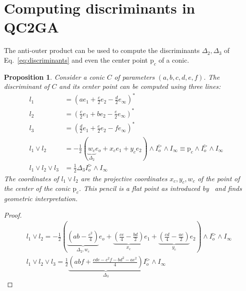 \documentclass{birkjour}
\newtheorem{proposition}{Proposition}
\begin{document}
\section{Computing discriminants in QC2GA}
\label{sec:discriminants}
The anti-outer product can be used to compute the discriminants \(\Delta_2, \Delta_3\) of Eq.~\eqref{eq:discriminants} and even the center point \(\mathrm{p}_c\) of a conic.

\begin{proposition}
    Consider a conic \(C\) of parameters \((a,b,c,d,e,f)\).
    The discriminant of \(C\) and its center point can be computed using three lines:
    \begin{align}
    l_1 &= \left(a e_1 + \frac{c}{2} e_2 - \frac{d}{2} e_\infty\right)^* \\
    l_2 &= \left(\frac{c}{2} e_1 + b e_2 - \frac{e}{2} e_\infty\right)^* \\
    l_3 &= \left(\frac{d}{2} e_1 + \frac{e}{2} e_2 - f e_\infty\right)^* \\
    l_1 \vee l_2 &= -\frac{1}{2}\left(\underbrace{w_c}_{\Delta_2} e_o + x_c e_{1} + y_c e_{2}\right) \wedge I_o^\triangleright \wedge I_\infty  \equiv \mathrm{p}_c \wedge I_o^\triangleright \wedge I_\infty  \\
    l_1 \vee l_2 \vee l_3 &= \frac{1}{2}\Delta_3 I_o^\triangleright\wedge I_\infty
    \end{align}
    The coordinates of \(l_1\vee l_2\) are the projective coordinates \(x_c, y_c, w_c\) of the point of the center of the conic \(\mathrm{p}_c\). This pencil is a flat point as introduced by~\cite{breuils_three-dimensional_2019} and finds geometric interpretation.%
\end{proposition}

\begin{proof}
\begin{align}
&l_1 \vee l_2 = 
-\frac{1}{2}\left( \underbrace{(ab-\frac{c^2}{4})}_{\Delta_2, w_c} e_o + \underbrace{(\frac{ce}{4}-\frac{bd}{2})}_{x_c} e_{1} + \underbrace{(\frac{cd}{4}-\frac{ae}{2})}_{y_c}  e_{2}\right) \wedge I_o^\triangleright \wedge I_\infty  \\
& l_1\vee l_2\vee l_3= \frac{1}{2}\underbrace{\left(abf+\frac{cde-c^2f-bd^2-ae^2}{4}\right)}_{\Delta_3} I_o^\triangleright\wedge I_\infty
\end{align}
\end{proof}
\end{document}
